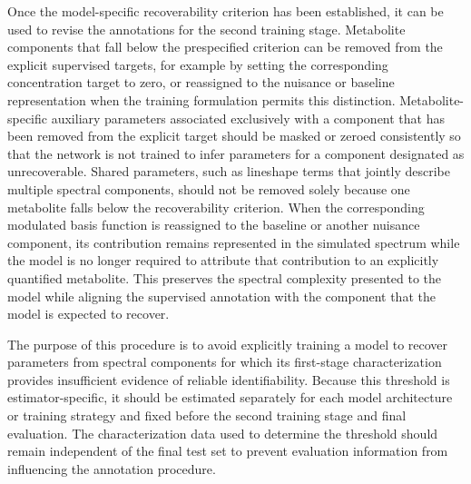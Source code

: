 Once the model-specific recoverability criterion has been established, it can be used to revise the annotations for the second training stage. Metabolite components that fall below the prespecified criterion can be removed from the explicit supervised targets, for example by setting the corresponding concentration target to zero, or reassigned to the nuisance or baseline representation when the training formulation permits this distinction. Metabolite-specific auxiliary parameters associated exclusively with a component that has been removed from the explicit target should be masked or zeroed consistently so that the network is not trained to infer parameters for a component designated as unrecoverable. Shared parameters, such as lineshape terms that jointly describe multiple spectral components, should not be removed solely because one metabolite falls below the recoverability criterion. When the corresponding modulated basis function is reassigned to the baseline or another nuisance component, its contribution remains represented in the simulated spectrum while the model is no longer required to attribute that contribution to an explicitly quantified metabolite. This preserves the spectral complexity presented to the model while aligning the supervised annotation with the component that the model is expected to recover.

The purpose of this procedure is to avoid explicitly training a model to recover parameters from spectral components for which its first-stage characterization provides insufficient evidence of reliable identifiability. Because this threshold is estimator-specific, it should be estimated separately for each model architecture or training strategy and fixed before the second training stage and final evaluation. The characterization data used to determine the threshold should remain independent of the final test set to prevent evaluation information from influencing the annotation procedure.

